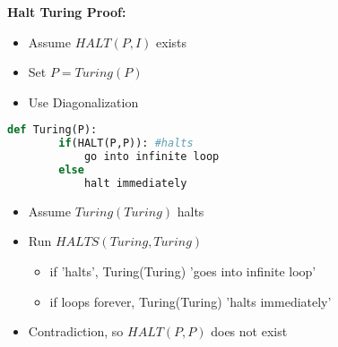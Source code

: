 \documentclass{article}\usepackage{amsmath,amssymb,amsthm,tikz,tkz-graph,color,chngpage,soul,hyperref,csquotes,graphicx,floatrow, listings}\newcommand*{\QEDB}{\hfill\ensuremath{\square}}\newtheorem*{prop}{Proposition}\renewcommand{\theenumi}{\alph{enumi}}\usepackage[shortlabels]{enumitem}\usepackage[nobreak=true]{mdframed}\usetikzlibrary{matrix,calc}\MakeOuterQuote{"}\usepackage[margin=0.75in]{geometry} \newtheorem{theorem}{Theorem}\newcommand{\Z}{\mathbb Z}\newcommand{\R}{\mathbb R}\newcommand{\Q}{\mathbb Q}\newcommand{\N}{\mathbb N}
\begin{document}
\begin{mdframed}
\textbf{Halt Turing Proof:}
\begin{itemize}
    \item Assume $HALT(P,I)$ exists
    \item Set $P = Turing(P)$
    \item Use Diagonalization
\end{itemize}
\begin{lstlisting}[language=Python]
    def Turing(P):
        if(HALT(P,P)): #halts
            go into infinite loop
        else
            halt immediately
\end{lstlisting}
\begin{itemize}
    \item Assume $Turing(Turing)$ halts
    \item Run $HALTS(Turing, Turing)$
    \begin{itemize}
        \item if 'halts', Turing(Turing) 'goes into infinite loop'
        \item if loops forever, Turing(Turing) 'halts immediately'
    \end{itemize}
    \item Contradiction, so $HALT(P,P)$ does not exist
\end{itemize}
\end{mdframed}
\end{document}
